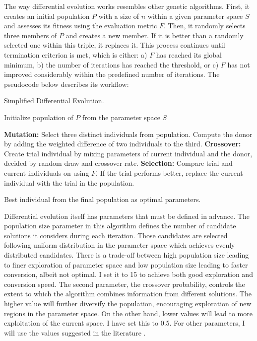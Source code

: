 \documentclass[a4paper,12pt]{article}
\begin{document}
The way differential evolution works resembles other genetic algorithms. First, it creates an initial population $P$ with a size of $n$ within a given parameter space $S$ and assesses its fitness using the evaluation metric $F$. Then, it randomly selects three members of $P$ and creates a new member. If it is better than a randomly selected one within this triple, it replaces it. This process continues until termination criterion is met, which is either: a) $F$ has reached its global minimum, b) the number of iterations has reached the threshold, or c) $F$ has not improved considerably within the predefined number of iterations. The pseudocode below describes its workflow:

\begin{algorithm}
\caption{Simplified Differential Evolution.}
\begin{algorithmic}[1]

\State Initialize population of $P$ from the parameter space $S$

        \State \textbf{Mutation:} Select three distinct individuals from population. Compute the donor by adding the weighted difference of two individuals to the third.
        \State \textbf{Crossover:} Create trial individual by mixing parameters of current individual and the donor, decided by random draw and crossover rate.
        \State \textbf{Selection:} Compare trial and current individuals on using $F$. If the trial performs better, replace the current individual with the trial in the population.
    \EndFor
\EndWhile

\State \Return Best individual from the final population as optimal parameters.

\end{algorithmic}
\end{algorithm}

Differential evolution itself has parameters that must be defined in advance. The population size parameter in this algorithm defines the number of candidate solutions it considers during each iteration. Those candidates are selected following uniform distribution in the parameter space which achieves evenly distributed candidates. There is a trade-off between high population size leading to finer exploration of parameter space and low population size leading to faster conversion, albeit not optimal. I set it to 15 to achieve both good exploration and conversion speed. The second parameter, the crossover probability, controls the extent to which the algorithm combines information from different solutions. The higher value will further diversify the population, encouraging exploration of new regions in the parameter space. On the other hand, lower values will lead to more exploitation of the current space. I have set this to 0.5. For other parameters, I will use the values suggested in the literature \citep{omidi2020differential}.
\end{document}
